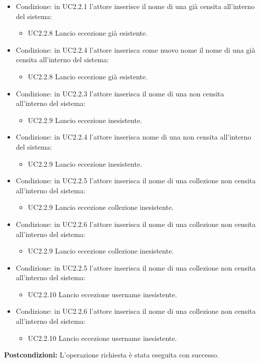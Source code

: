 \documentclass{scalatekids-article}
\begin{document}
\begin{itemize}
\item Condizione: in UC2.2.1 l'attore inserisce il nome di una  già censita all'interno del sistema:
  \begin{itemize}
  \item UC2.2.8 Lancio eccezione  già esistente.
  \end{itemize}
\item Condizione: in UC2.2.4  l'attore inserisca come nuovo nome il nome di una  già censita all'interno del sistema:
  \begin{itemize}
  \item UC2.2.8 Lancio eccezione  già esistente.
  \end{itemize}
\item Condizione: in UC2.2.3 l'attore inserisca il nome di una  non censita all'interno del sistema:
  \begin{itemize}
  \item UC2.2.9 Lancio eccezione  inesistente.
  \end{itemize}
\item Condizione: in UC2.2.4 l'attore inserisca nome di una  non censita all'interno del sistema:
  \begin{itemize}
  \item UC2.2.9 Lancio eccezione  inesistente.
  \end{itemize}
\item Condizione: in UC2.2.5 l'attore inserisca il nome di una collezione non censita all'interno del sistema:
  \begin{itemize}
  \item UC2.2.9 Lancio eccezione collezione inesistente.
  \end{itemize}
\item Condizione: in UC2.2.6 l'attore inserisca il nome di una collezione non censita all'interno del sistema:
  \begin{itemize}
  \item UC2.2.9 Lancio eccezione collezione inesistente.
  \end{itemize}
\item Condizione: in UC2.2.5 l'attore inserisca il nome di una collezione non censita all'interno del sistema:
  \begin{itemize}
  \item UC2.2.10 Lancio eccezione username inesistente.
  \end{itemize}
\item Condizione: in UC2.2.6 l'attore inserisca il nome di una collezione non censita all'interno del sistema:
  \begin{itemize}
  \item UC2.2.10 Lancio eccezione username inesistente.
  \end{itemize}
\end{itemize}
\textbf{Postcondizioni:} L'operazione richiesta è stata eseguita con successo.
\end{document}
